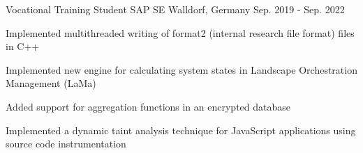 

\begin{cventries}


  \cventry
    {Vocational Training Student} %
    {SAP SE} %
    {Walldorf, Germany} %
    {Sep. 2019 - Sep. 2022} %
    {
      \begin{cvitems} %
        \item {Implemented multithreaded writing of format2 (internal research file format) files in C++}
        \item {Implemented new engine for calculating system states in Landscape Orchestration Management (LaMa)}
        \item {Added support for aggregation functions in an encrypted database}
        \item {Implemented a dynamic taint analysis technique for JavaScript applications using source code instrumentation}
      \end{cvitems}
    }
\end{cventries}
